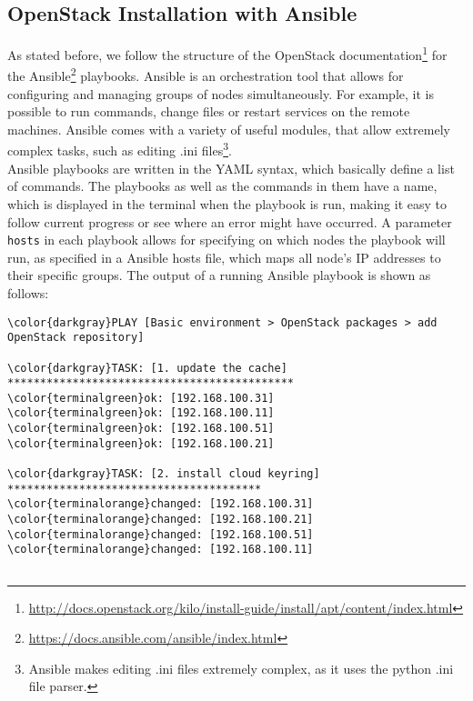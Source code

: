 \begin{appendix}
\subsection{OpenStack Installation with Ansible}
As stated before, we follow the structure of the OpenStack documentation\footnote{\url{http://docs.openstack.org/kilo/install-guide/install/apt/content/index.html}} for the Ansible\footnote{\url{https://docs.ansible.com/ansible/index.html}} playbooks. Ansible is an orchestration tool that allows for configuring and managing groups of nodes simultaneously. For example, it is possible to run commands, change files or restart services on the remote machines. Ansible comes with a variety of useful modules, that allow extremely complex tasks, such as editing .ini files\footnote{Ansible makes editing .ini files extremely complex, as it uses the python .ini file parser.}.\\

Ansible playbooks are written in the YAML syntax, which basically define a list of commands. The playbooks as well as the commands in them have a name, which is displayed in the terminal when the playbook is run, making it easy to follow current progress or see where an error might have occurred. A parameter \verb|hosts| in each playbook allows for specifying on which nodes the playbook will run, as specified in a Ansible hosts file, which maps all node's IP addresses to their specific groups. The output of a running Ansible playbook is shown as follows:
\begin{Verbatim}[commandchars=\\\{\}]
\color{darkgray}PLAY [Basic environment > OpenStack packages > add OpenStack repository]

\color{darkgray}TASK: [1. update the cache] ******************************************** 
\color{terminalgreen}ok: [192.168.100.31]
\color{terminalgreen}ok: [192.168.100.11]
\color{terminalgreen}ok: [192.168.100.51]
\color{terminalgreen}ok: [192.168.100.21]

\color{darkgray}TASK: [2. install cloud keyring] ***************************************
\color{terminalorange}changed: [192.168.100.31]
\color{terminalorange}changed: [192.168.100.21]
\color{terminalorange}changed: [192.168.100.51]
\color{terminalorange}changed: [192.168.100.11]


\end{Verbatim}
\end{appendix}

